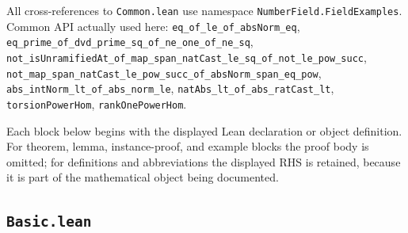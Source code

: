\documentclass[UTF8,a4paper,11pt,fontset=fandol]{ctexart}
\theoremstyle{definition}
\begin{document}
All cross-references to \texttt{Common.\allowbreak{}lean} use namespace \texttt{NumberField.\allowbreak{}FieldExamples}. Common API actually used here: \texttt{eq\_\allowbreak{}of\_\allowbreak{}le\_\allowbreak{}of\_\allowbreak{}absNorm\_\allowbreak{}eq}, \texttt{eq\_\allowbreak{}prime\_\allowbreak{}of\_\allowbreak{}dvd\_\allowbreak{}prime\_\allowbreak{}sq\_\allowbreak{}of\_\allowbreak{}ne\_\allowbreak{}one\_\allowbreak{}of\_\allowbreak{}ne\_\allowbreak{}sq}, \texttt{not\_\allowbreak{}isUnramifiedAt\_\allowbreak{}of\_\allowbreak{}map\_\allowbreak{}span\_\allowbreak{}natCast\_\allowbreak{}le\_\allowbreak{}sq\_\allowbreak{}of\_\allowbreak{}not\_\allowbreak{}le\_\allowbreak{}pow\_\allowbreak{}succ}, \texttt{not\_\allowbreak{}map\_\allowbreak{}span\_\allowbreak{}natCast\_\allowbreak{}le\_\allowbreak{}pow\_\allowbreak{}succ\_\allowbreak{}of\_\allowbreak{}absNorm\_\allowbreak{}span\_\allowbreak{}eq\_\allowbreak{}pow}, \texttt{abs\_\allowbreak{}intNorm\_\allowbreak{}lt\_\allowbreak{}of\_\allowbreak{}abs\_\allowbreak{}norm\_\allowbreak{}le}, \texttt{natAbs\_\allowbreak{}lt\_\allowbreak{}of\_\allowbreak{}abs\_\allowbreak{}ratCast\_\allowbreak{}lt}, \texttt{torsionPowerHom}, \texttt{rankOnePowerHom}.

Each block below begins with the displayed Lean declaration or object definition. For theorem, lemma, instance-proof, and example blocks the proof body is omitted; for definitions and abbreviations the displayed RHS is retained, because it is part of the mathematical object being documented.

\subsection{\texttt{Basic.lean}}
\end{document}
